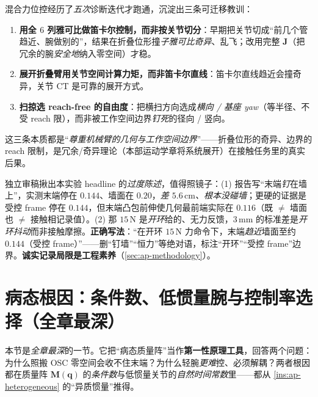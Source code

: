 \begin{insight}\label{ins:ap-hybrid-lessons}
混合力位控经历了\emph{五次}诊断迭代才跑通，沉淀出三条可迁移教训：
\begin{enumerate}
  \item \textbf{用全 $6$ 列雅可比做笛卡尔控制，而非按关节切分}：早期把关节切成“前几个管趋近、腕做别的”，结果在折叠位形撞\emph{子雅可比奇异}、乱飞；改用完整 $\mathbf{J}$（把冗余的腕\emph{安全地}纳入零空间）才稳。
  \item \textbf{展开折叠臂用关节空间计算力矩，而非笛卡尔直线}：笛卡尔直线趋近会撞奇异，关节 CT 是可靠的展开方式。
  \item \textbf{扫掠选 reach-free 的自由度}：把横扫方向选成\emph{横向 / 基座 yaw}（等半径、不受 reach 限），而非被工作空间边界\emph{钉死}的径向 / 竖向。
\end{enumerate}
这三条本质都是“\emph{尊重机械臂的几何与工作空间边界}”——折叠位形的奇异、边界的 reach 限制，是冗余/奇异理论（本部运动学章将系统展开）在接触任务里的真实后果。
\end{insight}

\begin{pitfall}\label{pit:ap-honest-wall}
独立审稿揪出本实验 headline 的\emph{过度陈述}，值得照镜子：(1) 报告写“末端\emph{钉}在墙上”，实测末端停在 $0.144$、墙面在 $0.20$，\emph{差 $5.6\,\mathrm{cm}$、根本没碰墙}；更硬的证据是受控 frame 停在 $0.144$，但末端凸包前伸使几何最前端实际在 $0.116$（既 $\ne$ 墙面也 $\ne$ 接触相记录值）。(2) 那 $15\,\mathrm{N}$ 是\emph{开环}给的、无力反馈，$3\,\mathrm{mm}$ 的标准差是\emph{开环抖动}而非接触摩擦。\textbf{正确写法}：“在开环 $15\,\mathrm{N}$ 力命令下，末端\emph{趋近}墙面至约 $0.144$（受控 frame）”——删“钉墙”“恒力”等绝对语，标注“开环”“受控 frame”边界。\textbf{诚实记录局限是工程素养}（\cref{sec:ap-methodology}）。
\end{pitfall}

\section{病态根因：条件数、低惯量腕与控制率选择（全章最深）}
\label{sec:ap-illcond}

本节是\emph{全章最深}的一节。它把“病态质量阵”当作\textbf{第一性原理工具}，回答两个问题：为什么照搬 OSC 零空间会收不住末端？为什么轻腕\emph{更难}控、必须解耦？两者根因都在质量阵 $\mathbf{M}(\mathbf{q})$ 的\emph{条件数}与低惯量关节的\emph{自然时间常数}里——都从 \cref{ins:ap-heterogeneous} 的“异质惯量”推得。

